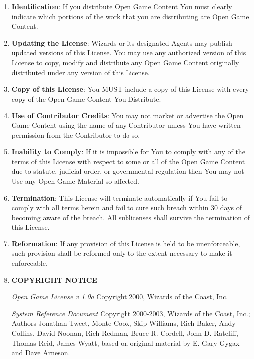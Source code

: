 \begin{small}
\begin{enumerate}
\item \textbf{Identification}: If you distribute Open Game Content You must clearly indicate which portions of the work that you are distributing are Open Game Content. 

\item \textbf{Updating the License}: Wizards or its designated Agents may publish updated versions of this License. You may use any authorized version of this License to copy, modify and distribute any Open Game Content originally distributed under any version of this License. 

\item \textbf{Copy of this License}: You MUST include a copy of this License with every copy of the Open Game Content You Distribute. 

\item \textbf{Use of Contributor Credits}: You may not market or advertise the Open Game Content using the name of any Contributor unless You have written permission from the Contributor to do so. 

\item \textbf{Inability to Comply}: If it is impossible for You to comply with any of the terms of this License with respect to some or all of the Open Game Content due to statute, judicial order, or governmental regulation then You may not Use any Open Game Material so affected. 

\item \textbf{Termination}: This License will terminate automatically if You fail to comply with all terms herein and fail to cure such breach within 30 days of becoming aware of the breach. All sublicenses shall survive the termination of this License. 

\item \textbf{Reformation}: If any provision of this License is held to be unenforceable, such provision shall be reformed only to the extent necessary to make it enforceable. 

\item \textbf{COPYRIGHT NOTICE}

\href{http://www.wizards.com/default.asp?x=d20/oglfaq/20040123f}{\textit{Open Game License v 1.0a}} Copyright 2000, Wizards of the Coast, Inc. 

\href{http://www.wizards.com/default.asp?x=d20/article/srd35}{\textit{System Reference Document}} Copyright 2000-2003, Wizards of the Coast, Inc.; Authors Jonathan Tweet, Monte Cook, Skip Williams, Rich Baker, Andy Collins, David Noonan, Rich Redman, Bruce R. Cordell, John D. Rateliff, Thomas Reid, James Wyatt, based on original material by E. Gary Gygax and Dave Arneson.


\end{enumerate}
\end{small}
